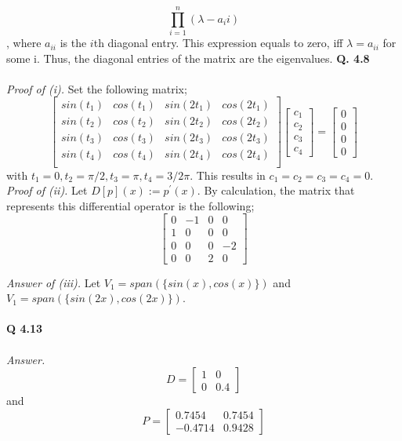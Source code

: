 \documentclass[letterpaper,12pt]{article}
\theoremstyle{definition}
\begin{document}
\[\prod_{i=1}^{n}(\lambda - a_ii)\]
, where $a_{ii}$ is the $i$th diagonal entry. This expression equals to zero, iff $\lambda = a_{ii}$ for some i. Thus, the diagonal entries of the matrix are the eigenvalues.
\newline
\textbf{Q. 4.8} \\\\
\emph{Proof of (i). } Set the following matrix;
\[\begin{bmatrix}
    sin(t_1) & cos(t_1) & sin(2t_1) & cos(2t_1) \\
    sin(t_2) & cos(t_2) & sin(2t_2) & cos(2t_2) \\
    sin(t_3) & cos(t_3) & sin(2t_3) & cos(2t_3) \\
    sin(t_4) & cos(t_4) & sin(2t_4) & cos(2t_4) \\
  \end{bmatrix}  \begin{bmatrix}
                   c_1 \\
                   c_2 \\
                   c_3 \\
                   c_4
                 \end{bmatrix}  = \begin{bmatrix}
                                    0 \\
                                    0 \\
                                    0 \\
                                    0
                                  \end{bmatrix}\]
with $t_1 = 0, t_2 = \pi /2, t_3 = \pi, t_4 = 3/2 \pi$. This results in $c_1=c_2=c_3=c_4=0$.
\newline
\emph{Proof of (ii).} Let $D[p](x) := p^{'}(x)$. By calculation, the matrix that represents this differential operator is the following;
\[ \begin{bmatrix}
     0 & -1 & 0 & 0 \\
     1 & 0 & 0 & 0 \\
     0 & 0 & 0 & -2 \\
     0 & 0 & 2 & 0
   \end{bmatrix}\]

\emph{Answer of (iii). }
Let $V_1 = span(\{sin(x), cos(x)\})$ and $V_1 = span(\{sin(2x), cos(2x)\})$. \\\\

\textbf{Q 4.13} \\\\
\emph{Answer.}
\[D = \begin{bmatrix}
    1 & 0 \\
    0 & 0.4
  \end{bmatrix}\]
and
\[P = \begin{bmatrix}
        0.7454 & 0.7454 \\
        -0.4714 & 0.9428
      \end{bmatrix}\]
\end{document}
